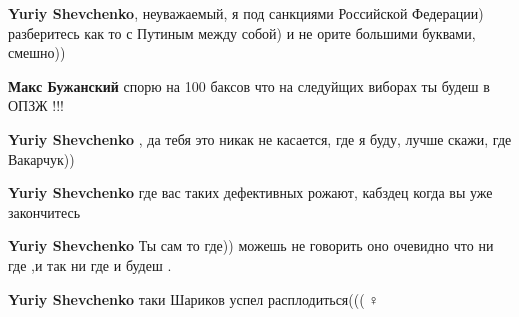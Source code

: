 \begin{itemize}
\begin{itemize}
\textbf{Yuriy Shevchenko}, неуважаемый, я под санкциями Российской Федерации) разберитесь как то с Путиным между собой) и не орите большими буквами, смешно))

 
\textbf{Макс Бужанский} спорю на 100 баксов что на следуйщих виборах ты будеш в ОПЗЖ !!!

 
\textbf{Yuriy Shevchenko} , да тебя это никак не касается, где я буду, лучше скажи, где Вакарчук))

 
\textbf{Yuriy Shevchenko} где вас таких дефективных рожают, кабздец когда вы уже закончитесь

 
\textbf{Yuriy Shevchenko} Ты сам то где)) можешь не говорить оно очевидно что ни где ,и так ни где и будеш .

 
\textbf{Yuriy Shevchenko} таки Шариков успел расплодиться(((🤦♀️
\end{itemize}

 


\end{itemize}
